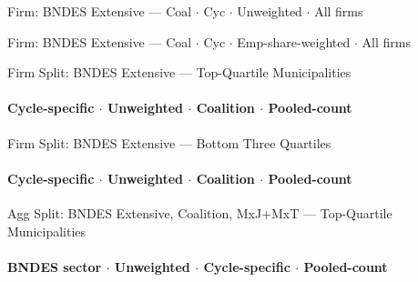 \documentclass[aspectratio=169,10pt]{beamer}
\newcommand{\tfirm}{../tables/firm}
\newcommand{\tbndes}{../tables/agg_firm_bndes_sector}
\begin{document}

\begin{frame}[t,shrink=5]{Firm: BNDES Extensive --- Coal $\cdot$ Cyc $\cdot$ Unweighted $\cdot$ All firms}
\begin{center}\footnotesize

\end{center}
\end{frame}


\begin{frame}[t,shrink=5]{Firm: BNDES Extensive --- Coal $\cdot$ Cyc $\cdot$ Emp-share-weighted $\cdot$ All firms}
\begin{center}\footnotesize

\end{center}
\end{frame}


\begin{frame}[t,shrink=5]{Firm Split: BNDES Extensive --- Top-Quartile Municipalities}
\framesubtitle{Cycle-specific $\cdot$ Unweighted $\cdot$ Coalition $\cdot$ Pooled-count}
\begin{center}\footnotesize

\end{center}
\end{frame}

\begin{frame}[t,shrink=5]{Firm Split: BNDES Extensive --- Bottom Three Quartiles}
\framesubtitle{Cycle-specific $\cdot$ Unweighted $\cdot$ Coalition $\cdot$ Pooled-count}
\begin{center}\footnotesize

\end{center}
\end{frame}


\begin{frame}[t,shrink=5]{Agg Split: BNDES Extensive, Coalition, MxJ+MxT --- Top-Quartile Municipalities}
\framesubtitle{BNDES sector $\cdot$ Unweighted $\cdot$ Cycle-specific $\cdot$ Pooled-count}
\begin{center}\footnotesize

\end{center}
\end{frame}
\end{document}
